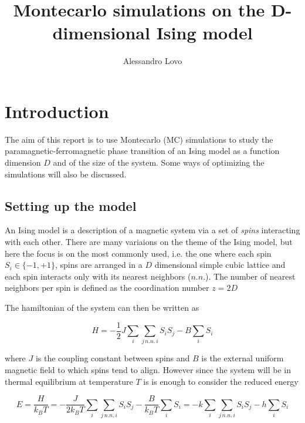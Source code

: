 \documentclass[a4paper, 11pt]{article}
\begin{document}
\title{Montecarlo simulations on the D-dimensional Ising model}
\author{Alessandro Lovo}

\maketitle


\section{Introduction}
  The aim of this report is to use Montecarlo (MC) simulations to study the paramagnetic-ferromagnetic phase transition of an Ising model as a function dimension $D$ and of the size of the system. Some ways of optimizing the simulations will also be discussed.

  \subsection{Setting up the model}
    An Ising model is a description of a magnetic system via a set of \emph{spins} interacting with each other.
    There are many variaions on the theme of the Ising model, but here the focus is on the most commonly used, i.e. the one where each spin $S_i \in \{-1, +1\}$, spins are arranged in a $D$ dimensional simple cubic lattice and each spin interacts only with its nearest neighbors ($n.n.$).
    The number of nearest neighbors per spin is defined as the coordination number $z = 2D$

    The hamiltonian of the system can then be written as

    \begin{equation}
      H = -\frac{1}{2} J \sum_i \sum_{j \, n.n. \, i} S_i S_j - B \sum_i S_i
    \end{equation}

    where $J$ is the coupling constant between spins and $B$ is the external uniform magnetic field to which spins tend to align. However since the system will be in thermal equilibrium at temperature $T$ is is enough to consider the reduced energy

    \begin{equation}
      E = \frac{H}{k_BT} = -\frac{J}{2k_BT}  \sum_i \sum_{j \, n.n. \, i} S_i S_j - \frac{B}{k_BT} \sum_i S_i = -k\sum_i \sum_{j \, n.n. \, i} S_i S_j - h\sum_i S_i
    \end{equation}
\end{document}
